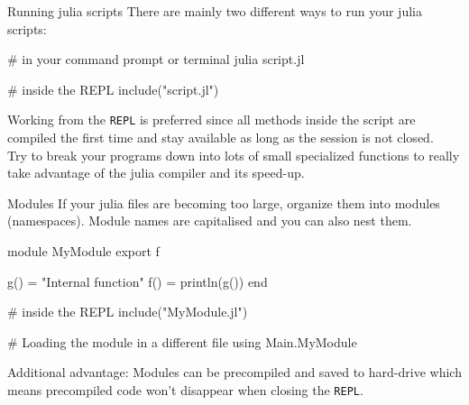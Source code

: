 \documentclass{beamer}
\newenvironment{Boxx}{\begin{tcolorbox}[standard jigsaw, opacityframe=0.8, opacityback=0.0]}{\end{tcolorbox}}
\begin{document}
\begin{frame}[fragile]{Running julia scripts}
	There are mainly two different ways to run your julia scripts:
	\begin{Boxx}
 \begin{jllisting}
  # in your command prompt or terminal
  julia script.jl
  
  # inside the REPL
  include("script.jl")
\end{jllisting}
\end{Boxx}
Working from the \verb|REPL| is preferred since all methods inside the script are compiled the first time and stay available as long as the session is not closed.\\

\vspace{4mm}
Try to break your programs down into lots of small specialized functions to really take advantage of the julia compiler and its speed-up.
\end{frame}


\begin{frame}[fragile]{Modules}
If your julia files are becoming too large, organize them into modules (namespaces). Module names are capitalised and you can also nest them.
\begin{Boxx}
  \begin{jllisting}
  module MyModule
    export f

    g() = "Internal function"
    f() = println(g())
  end
  
  # inside the REPL
  include("MyModule.jl")
  
  # Loading the module in a different file
  using Main.MyModule
  \end{jllisting}
\end{Boxx}
Additional advantage: Modules can be precompiled and saved to hard-drive which means precompiled code won't disappear when closing the \verb|REPL|.
\end{frame}
\end{document}
